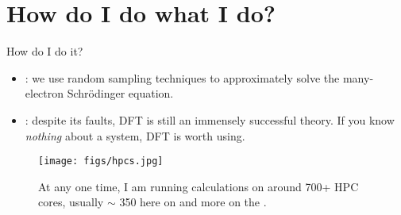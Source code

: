 \documentclass[12pt, pdf, hyperref={draft}, usenames, dvipsnames]{beamer}
\newcommand{\red}[1]{{\bf\color{LancsRed}{#1}}}
\newcommand{\blue}[1]{{\bf\color{NavyBlue}{#1}}}
\newcommand{\green}[1]{{\bf\color{ForestGreen}{#1}}}
\begin{document}
\section{How do I do what I do?}
\begin{frame}{How do I do it?}
  \begin{itemize}

    \item \green{Quantum Monte Carlo} : we use random sampling
    techniques to approximately solve the \red{full} many-electron
    Schr\"{o}dinger equation.

    \item \blue{Density Functional Theory} : despite its faults, DFT is still
    an immensely successful theory. If you know \textit{nothing} about a
    system, DFT is worth using.
  \end{itemize}
    \begin{figure}[H]
      \centering
      \texttt{[image: figs/hpcs.jpg]}
      \caption{At any one time, I am running calculations on around 700+ HPC
      cores, usually $\sim$ 350 here on \green{HEC} and more on the
      \green{N8 HPC}.}
      \label{fig:hpcs}
    \end{figure}
\end{frame}


\end{document}
